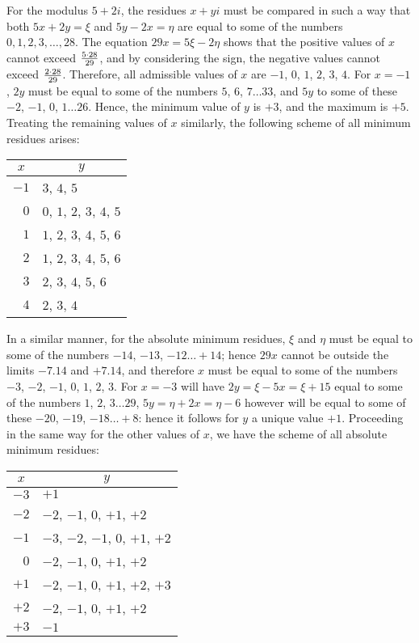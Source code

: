 \documentclass[twoside,12pt, showframe]{memoir}
\let\oldfrac\frac
\def\frac#1#2{\mathchoice{\tfrac{#1}{#2}}{\oldfrac{#1}{#2}}{\genfrac{}{}{}{2}{#1}{#2\mathstrut}}{\genfrac{}{}{}{3}{#1}{#2\mathstrut}}}
\begin{document}
For the modulus \(5+2i\), the residues \(x+yi\) must be compared in such a way that both \(5x+2y=\xi\) and \(5y-2x=\eta\) are equal to some of the numbers \(0, 1, 2, 3, \ldots, 28\). The equation \(29x=5\xi-2\eta\) shows that the positive values of \(x\) cannot exceed \(\frac{5 \cdot 28}{29}\), and by considering the sign, the negative values cannot exceed \(\frac{2 \cdot 28}{29}\). Therefore, all admissible values of \(x\) are \(-1\), \( 0\), \(1\), \(2\), \(3\), \(4\). For \(x=-1\), \(2y\) must be equal to some of the numbers \(5\), \(6\), \(7 \ldots 33\), and \(5y\) to some of these \(-2\), \(-1\), \(0\), \(1 \ldots 26\). Hence, the minimum value of \(y\) is \(+3\), and the maximum is \(+5\). Treating the remaining values of \(x\) similarly, the following scheme of all minimum residues arises:

\begin{center}
\begin{tabular}{r|l}
\multicolumn{1}{c|}{\(x\)} & \multicolumn{1}{c}{\(y\)} \\
\hline
\(-1\) & \(3\), \(4\), \(5\) \\
\(0\) & \(0\), \(1\), \(2\), \(3\), \(4\), \(5\) \\
\(1\) & \(1\), \(2\), \(3\), \(4\), \(5\), \(6\) \\
\(2\) & \(1\), \(2\), \(3\), \(4\), \(5\), \(6\) \\
\(3\) & \(2\), \(3\), \(4\), \(5\), \(6\) \\
\(4\) & \(2\), \(3\), \(4\) \\
\end{tabular}
\end{center}
%

In a similar manner, for the absolute minimum residues, \(\xi\) and \(\eta\) must be equal to some of the numbers \(-14\), \(-13\), \(-12 \ldots+14\); hence \(29 x\) cannot be outside the limits \(-7.14\) and \(+7.14\), and therefore \(x\) must be equal to some of the numbers \(-3\), \(-2\), \(-1\), \(0\), \(1\), \(2\), \(3\). For \(x=-3\) will have \(2 y=\xi-5 x=\xi+15\) equal to some of the numbers \(1\), \(2\), \(3 \ldots 29\), \(5 y=\eta+2 x=\eta-6\) however will be equal to some of these \(-20\), \(-19\), \(-18 \ldots+8\): hence it follows for \(y\) a unique value \(+1\). Proceeding in the same way for the other values of \(x\), we have the scheme of all absolute minimum residues:
\begin{center}
\begin{tabular}{r|l}
\multicolumn{1}{c|}{\(x\)} & \multicolumn{1}{c}{\(y\)} \\
\hline
\(-3\) & \(+1\) \\
\(-2\) & \(-2\), \(-1\), \(0\), \(+1\), \(+2\) \\
\(-1\) & \(-3\), \(-2\), \(-1\), \(0\), \(+1\), \(+2\) \\
\(0\) & \(-2\), \(-1\), \(0\), \(+1\), \(+2\) \\
\(+1\) & \(-2\), \(-1\), \(0\), \(+1\), \(+2\), \(+3\) \\
\(+2\) & \(-2\), \(-1\), \(0\), \(+1\), \(+2\) \\
\(+3\) & \(-1\) \\
\end{tabular}
\end{center}
%
\end{document}

